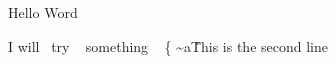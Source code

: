 \documentclass{article}
\begin{document}
Hello Word

I will~ try ~ something ~ \{ \textasciitilde a\~
This is the second line 
\end{document}
